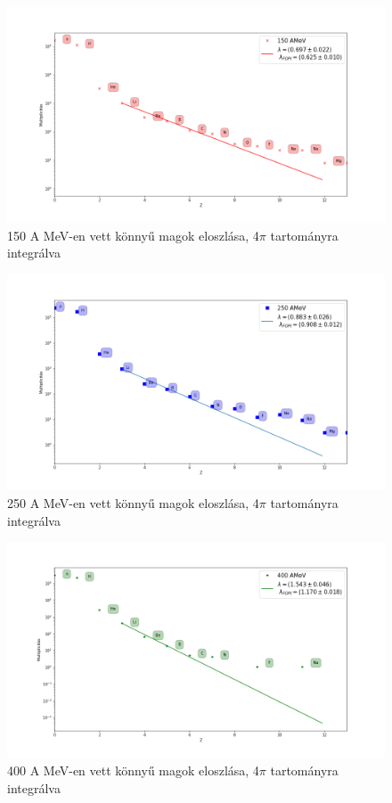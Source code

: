 \documentclass[a4paper,12pt]{article}
\begin{document}
\begin{figure}[H]
\begin{minipage}{\textwidth}
\centering
\includegraphics[width=\textwidth]{./FOPI150.png}
\caption{150 A MeV-en vett könnyű magok eloszlása, 4$\pi$ tartományra integrálva}
\end{minipage}
\end{figure}
\begin{figure}[H]
\begin{minipage}{\textwidth}
\centering
\includegraphics[width=\textwidth]{./FOPI250.png}
\caption{250 A MeV-en vett könnyű magok eloszlása, 4$\pi$ tartományra integrálva}
\end{minipage}
\end{figure}
\begin{figure}[H]
\begin{minipage}{\textwidth}
\centering
\includegraphics[width=\textwidth]{./FOPI400.png}
\caption{400 A MeV-en vett könnyű magok eloszlása, 4$\pi$ tartományra integrálva}
\end{minipage}
\end{figure}
\end{document}
